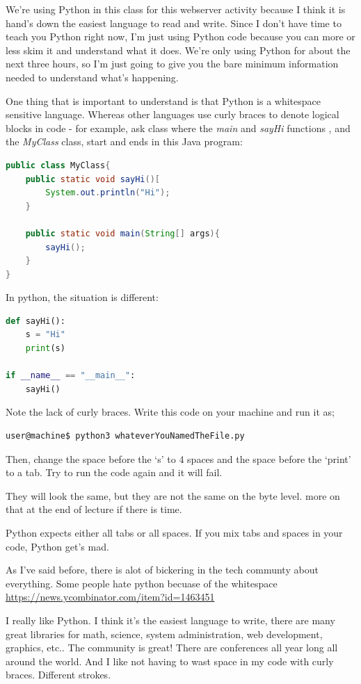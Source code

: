 \documentclass[10pt]{article}
\begin{document}
We're using Python in this class for this webserver activity because I think it is hand's down the easiest language to read and write. Since I don't have time to teach you Python right now, I'm just using Python code because you can more or less skim it and understand what it does. We're only using Python for about the next three hours, so I'm just going to give you  the bare minimum information needed to understand what's happening.

One thing that is important to understand is that Python is a whitespace sensitive language. Whereas other languages use curly braces to denote logical blocks in code - for example, ask class where the \textit{main} and \textit{sayHi} functions , and the \textit{MyClass} class, start and ends in this Java program:
\begin{lstlisting}[language=Java]
public class MyClass{
	public static void sayHi()[
		System.out.println("Hi");
	}

	public static void main(String[] args){
		sayHi();
	}
}
\end{lstlisting}

In python, the situation is different:

\begin{lstlisting}[language=Python]
def sayHi():
	s = "Hi"
	print(s)

if __name__ == "__main__":
	sayHi()
\end{lstlisting}

Note the lack of curly braces. Write this code on your machine and run it as;

\begin{lstlisting}
user@machine$ python3 whateverYouNamedTheFile.py
\end{lstlisting}

Then, change the space before the `s' to 4 spaces and the space before the `print' to a tab. Try to run the code again and it will fail.

 They will look the same, but they are not the same on the byte level. more on that at the end of lecture if there is time. 

Python expects either all tabs or all spaces. If you mix tabs and spaces in your code, Python get's mad.


As I've said before, there is alot of bickering in the tech communty about everything. Some people hate python becuase of the whitespace
\url{https://news.ycombinator.com/item?id=1463451}

I really like Python. I think it's the easiest language to write, there are many great libraries for math, science, system administration, web development, graphics, etc.. The community is great! There are conferences all year long all around the world. And I like not having to wast space in my code with curly braces. Different strokes.
\end{document}
